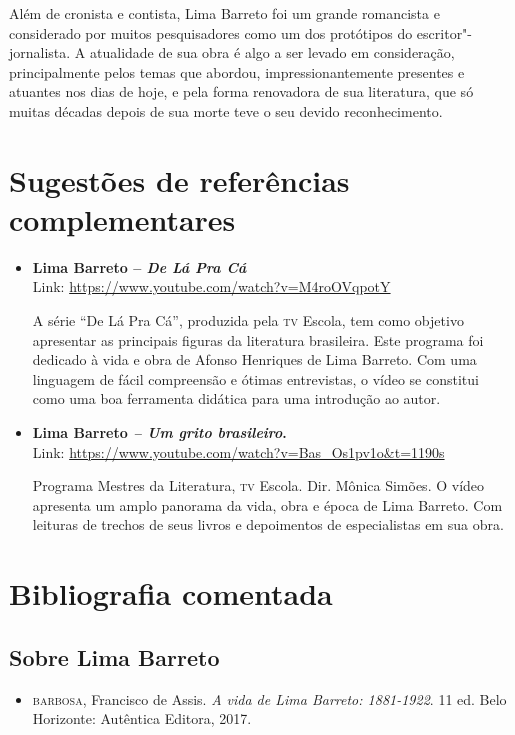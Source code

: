 \documentclass[11pt]{extarticle}
\begin{document}
{{Além de cronista e contista, Lima Barreto foi um grande romancista e
considerado por muitos pesquisadores como um dos protótipos do
escritor"-jornalista. A atualidade de sua obra é algo a ser levado em
consideração, principalmente pelos temas que abordou,
impressionantemente presentes e atuantes nos dias de hoje, e pela forma
renovadora de sua literatura, que só muitas décadas depois de sua morte
teve o seu devido reconhecimento.

\section{Sugestões de referências complementares}

\begin{itemize}
\item \textbf{Lima Barreto -- \emph{De Lá Pra Cá} }\\
Link: \url{https://www.youtube.com/watch?v=M4roOVqpotY}

A série ``De Lá Pra Cá'', produzida pela \textsc{tv} Escola, tem como objetivo
apresentar as principais figuras da literatura brasileira. Este programa
foi dedicado à vida e obra de Afonso Henriques de Lima Barreto. Com uma
linguagem de fácil compreensão e ótimas entrevistas, o vídeo se
constitui como uma boa ferramenta didática para uma introdução ao autor.

\item \textbf{Lima Barreto \emph{-- Um grito brasileiro}. }\\
Link: \url{https://www.youtube.com/watch?v=Bas_Os1pv1o\&t=1190s}

Programa Mestres da Literatura, \textsc{tv} Escola. Dir. Mônica Simões. O vídeo
apresenta um amplo panorama da vida, obra e época de Lima Barreto. Com
leituras de trechos de seus livros e depoimentos de especialistas em sua
obra.
\end{itemize}


\section{Bibliografia comentada}


\subsection{Sobre Lima Barreto}


\begin{itemize}

\item \textsc{barbosa}, Francisco de Assis. \emph{A vida de Lima Barreto: 1881-1922}.
11 ed. Belo Horizonte: Autêntica Editora, 2017. 


\end{itemize}}}
\end{document}
